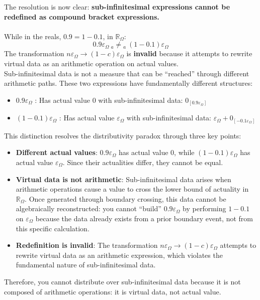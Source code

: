 \documentclass{article}
\begin{document}
The resolution is now clear: \textbf{sub-infinitesimal expressions cannot be redefined as compound bracket expressions.}
\\\\While in the reals, $0.9 = 1 - 0.1$, in $\mathbb{R}_\Omega$:
$$0.9\varepsilon_\Omega \ {}_a{\neq}{}_a \ (1 - 0.1)\varepsilon_\Omega$$The transformation $n\varepsilon_\Omega \to (1-c)\varepsilon_\Omega$ is \textbf{invalid} because it attempts to rewrite virtual data as an arithmetic operation on actual values.\\Sub-infinitesimal data is not a measure that can be ``reached'' through different arithmetic paths. These two expressions have fundamentally different structures:
\begin{itemize}
\item $0.9\varepsilon_\Omega$ : Has actual value $0$ with sub-infinitesimal data: $0_{[0.9\varepsilon_\Omega]}$
\item $(1-0.1)\varepsilon_\Omega$ : Has actual value $\varepsilon_\Omega$ with sub-infinitesimal data: $\varepsilon_\Omega + 0_{[-0.1\varepsilon_\Omega]}$
\end{itemize}

This distinction resolves the distributivity paradox through three key points:
\begin{itemize}
\item \textbf{Different actual values}: $0.9\varepsilon_\Omega$ has actual value $0$, while $(1-0.1)\varepsilon_\Omega$ has actual value $\varepsilon_\Omega$. Since their actualities differ, they cannot be equal.
\item \textbf{Virtual data is not arithmetic}: Sub-infinitesimal data arises when arithmetic operations cause a value to cross the lower bound of actuality in $\mathbb{R}_\Omega$. Once generated through boundary crossing, this data cannot be algebraically reconstructed: you cannot ``build'' $0.9\varepsilon_\Omega$ by performing $1 - 0.1$ on $\varepsilon_\Omega$ because the data already exists from a prior boundary event, not from this specific calculation.
\item \textbf{Redefinition is invalid}: The transformation $n\varepsilon_\Omega \to (1-c)\varepsilon_\Omega$ attempts to rewrite virtual data as an arithmetic expression, which violates the fundamental nature of sub-infinitesimal data.
\end{itemize}

Therefore, you cannot distribute over sub-infinitesimal data because it is not composed of arithmetic operations: it is virtual data, not actual value.
\end{document}
